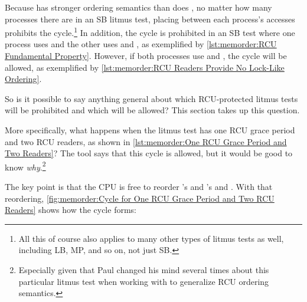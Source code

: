 Because  has stronger ordering semantics than does
, no matter how many processes there are in an SB
litmus test, placing  between each process's
accesses prohibits the cycle.\footnote{
	All this of course also applies to many other types of litmus tests
	as well, including LB, MP, and so on, not just SB.}
In addition, the cycle is prohibited in an SB test where one process
uses  and the other uses  and
, as exemplified by
\cref{lst:memorder:RCU Fundamental Property}.
However, if both processes use  and
, the cycle will be allowed, as exemplified by
\cref{lst:memorder:RCU Readers Provide No Lock-Like Ordering}.

So is it possible to say anything general about which RCU-protected
litmus tests will be prohibited and which will be allowed?
This section takes up this question.

\begin{listing}[tb]

\caption{One RCU Grace Period and Two Readers}
\label{lst:memorder:One RCU Grace Period and Two Readers}
\end{listing}

\begin{listing}[tb]

\caption{Two RCU Grace Periods and Two Readers}
\label{lst:memorder:Two RCU Grace Periods and Two Readers}
\end{listing}

More specifically, what happens when the litmus test has one RCU grace
period and two RCU readers, as shown in
\cref{lst:memorder:One RCU Grace Period and Two Readers}?
The  tool says that this cycle is allowed, but it would be
good to know \emph{why}.\footnote{
	Especially given that Paul changed his mind several times about
	this particular litmus test when working with  to
	generalize RCU ordering semantics.}

The key point is that the CPU is free to reorder 's and 's
 and .
With that reordering,
\cref{fig:memorder:Cycle for One RCU Grace Period and Two RCU Readers}
shows how the cycle forms:

